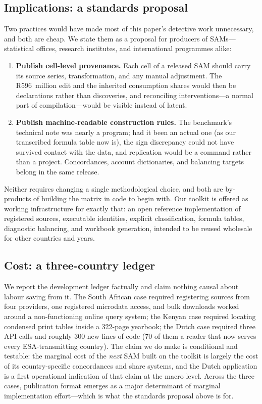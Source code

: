 \subsection{Implications: a standards proposal}
\label{sec:discussion:standards}

Two practices would have made most of this paper's detective work
unnecessary, and both are cheap. We state them as a proposal for producers
of SAMs---statistical offices, research institutes, and international
programmes alike:

\begin{enumerate}
  \item \textbf{Publish cell-level provenance.} Each cell of a released SAM
  should carry its source series, transformation, and any manual
  adjustment. The R596~million edit and the inherited consumption shares
  would then be declarations rather than discoveries, and reconciling
  interventions---a normal part of compilation---would be visible instead
  of latent.
  \item \textbf{Publish machine-readable construction rules.} The
  benchmark's technical note was nearly a program; had it been an actual
  one (as our transcribed formula table now is), the sign discrepancy could
  not have survived contact with the data, and replication would be a
  command rather than a project. Concordances, account dictionaries, and
  balancing targets belong in the same release.
\end{enumerate}

Neither requires changing a single methodological choice, and both are
by-products of building the matrix in code to begin with. Our toolkit is
offered as working infrastructure for exactly that: an open reference
implementation of registered sources, executable identities, explicit
classification, formula tables, diagnostic balancing, and workbook
generation, intended to be reused wholesale for other countries and years.

\subsection{Cost: a three-country ledger}

We report the development ledger factually and claim nothing causal about
labour saving from it. The South African case required registering
sources from four providers, one registered microdata access, and bulk
downloads worked around a non-functioning online query system; the Kenyan
case required locating condensed print tables inside a 322-page yearbook;
the Dutch case required three API calls and roughly 300 new lines of code
(70 of them a reader that now serves every ESA-transmitting country). The
claim we do make is conditional and testable: the marginal cost of the
\emph{next} SAM built on the toolkit is largely the cost of its
country-specific concordances and share systems, and the Dutch
application is a first operational indication of that claim at the macro
level. Across the three cases, publication format emerges as a major
determinant of marginal implementation effort---which is what the
standards proposal above is for.

